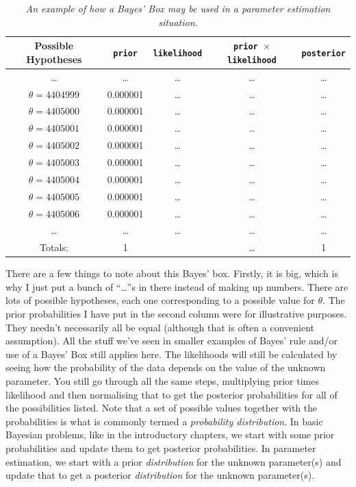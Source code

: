 \begin{table}[ht!]
\begin{center}
\begin{tabular}{|c|c|c|c|c|}
\hline
{\bf Possible Hypotheses} & {\tt prior} & {\tt likelihood} &
{\tt prior $\times$ likelihood} & {\tt posterior}\\
\hline
\ldots & \ldots & \ldots & \ldots & \ldots\\
$\theta = 4404999$ & 0.000001 & \ldots   & \ldots  & \ldots\\
$\theta = 4405000$ & 0.000001 & \ldots   & \ldots  & \ldots\\
$\theta = 4405001$ & 0.000001 & \ldots   & \ldots  & \ldots\\
$\theta = 4405002$ & 0.000001 & \ldots   & \ldots  & \ldots\\
$\theta = 4405003$ & 0.000001 & \ldots   & \ldots  & \ldots\\
$\theta = 4405004$ & 0.000001 & \ldots   & \ldots  & \ldots\\
$\theta = 4405005$ & 0.000001 & \ldots   & \ldots  & \ldots\\
$\theta = 4405006$ & 0.000001 & \ldots   & \ldots  & \ldots\\
\ldots & \ldots & \ldots & \ldots & \ldots\\
\hline
Totals: & 1 & & \ldots & 1\\
\hline
\end{tabular}
\caption{\it An example of how a Bayes' Box may be used in a parameter
estimation situation.\label{tab:nz_pop}}
\end{center}
\end{table}

There are a few things to note about this Bayes' box. Firstly, it is big, which
is why I just put a bunch of ``\ldots''s in there instead of making up numbers.
There are lots of possible hypotheses, each one corresponding to a possible value
for
$\theta$. The prior probabilities I have put in the second column were for
illustrative purposes. They needn't necessarily all be equal (although that is
often a convenient assumption). All the
stuff we've seen in smaller examples of Bayes' rule and/or use of a Bayes' Box
still applies here. The likelihoods will
still be calculated by seeing how the probability of the data depends on the
value of the unknown parameter. You still go through all the same steps,
multiplying prior times likelihood and then normalising that to get the
posterior probabilities for all of the possibilities listed. Note that a set
of possible values together with the probabilities is what is commonly termed
a {\it probability distribution}. In basic Bayesian problems, like in the
introductory chapters, we start with some prior probabilities and update them
to get posterior probabilities. In parameter estimation, we start with a prior
{\it distribution} for the unknown parameter(s) and update that to get a
posterior {\it distribution} for the unknown parameter(s).

